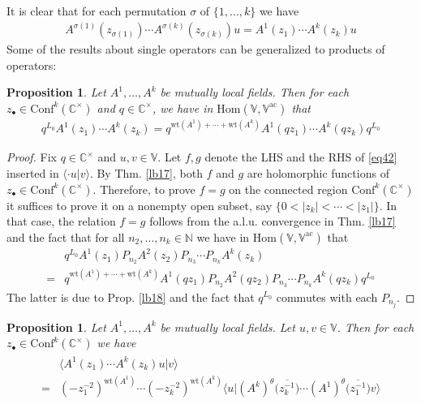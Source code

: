 \documentclass[12pt,b5paper,notitlepage]{article}
\theoremstyle{definition}
\theoremstyle{plain}
\newtheorem{pp}[df]{Proposition}
\newcommand{\ovl}{\overline}
\newcommand{\Hom}{\mathrm{Hom}}
\newcommand{\Conf}{\mathrm{Conf}}
\newcommand{\bk}[1]{\langle {#1}\rangle}
\newcommand{\bigbk}[1]{\big\langle {#1}\big\rangle}
\newcommand{\blt}{\bullet}
\newcommand{\Vbb}{\mathbb V}
\newcommand{\Cbb}{\mathbb C}
\newcommand{\Nbb}{\mathbb N}
\newcommand{\wt}{\mathrm{wt}}
\newcommand{\ac}{\mathrm{ac}}
\numberwithin{equation}{section}
\begin{document}
It is clear that for each permutation $\sigma$ of $\{1,\dots,k\}$ we have
\begin{align}\label{eq77}
A^{\sigma(1)}(z_{\sigma(1)})\cdots A^{\sigma(k)}(z_{\sigma(k)})u=A^1(z_1)\cdots A^k(z_k)u
\end{align}
Some of the results about single operators can be generalized to products of operators:

\begin{pp}\label{lb19}
Let $A^1,\dots,A^k$ be mutually local fields. Then for each $z_\blt\in\Conf^k(\Cbb^\times)$ and $q\in\Cbb^\times$, we have in $\Hom(\Vbb,\Vbb^\ac)$ that
\begin{align}\label{eq42}
q^{L_0}A^1(z_1)\cdots A^k(z_k)=q^{\wt(A^1)+\cdots+\wt(A^k)}A^1(qz_1)\cdots A^k(qz_k)q^{L_0}
\end{align}
\end{pp}

\begin{proof}
Fix $q\in\Cbb^{\times}$ and $u,v\in\Vbb$. Let $f,g$ denote the LHS and the RHS of \eqref{eq42} inserted in $\bk{\cdot u|v}$. By Thm. \ref{lb17}, both $f$ and $g$ are holomorphic functions of $z_\blt\in\Conf^k(\Cbb^\times)$. Therefore, to prove $f=g$ on the connected region $\Conf^k(\Cbb^\times)$ it suffices to prove it on a nonempty open subset, say $\{0<|z_k|<\cdots<|z_1|\}$. In that case, the relation $f=g$ follows from the a.l.u. convergence in Thm. \ref{lb17} and the fact that for all $n_2,\dots,n_k\in\Nbb$ we have in $\Hom(\Vbb,\Vbb^\ac)$ that
\begin{align*}
&q^{L_0}A^1(z_1)P_{n_2}A^2(z_2)P_{n_3}\cdots P_{n_k}A^k(z_k)\\
=&q^{\wt(A^1)+\cdots+\wt(A^k)}A^1(qz_1)P_{n_2}A^2(qz_2)P_{n_3}\cdots P_{n_k}A^k(qz_k)q^{L_0}
\end{align*}
The latter is due to Prop. \ref{lb18} and the fact that $q^{L_0}$ commutes with each $P_{n_j}$.
\end{proof}


\begin{pp}\label{lb21}
Let $A^1,\dots,A^k$ be mutually local fields. Let $u,v\in\Vbb$. Then for each $z_\blt\in\Conf^k(\Cbb^\times)$ we have
\begin{align}\label{eq43}
\begin{aligned}
&\bk{A^1(z_1)\cdots A^k(z_k)u|v}\\
=&(-z_1^{-2})^{\wt(A^1)}\cdots (-z_k^{-2})^{\wt(A^k)}\bigbk{u\big|(A^k)^\theta\big(\ovl{z_k^{-1}}\big)\cdots(A^1)^\theta\big(\ovl{z_1^{-1}} \big)v}
\end{aligned}
\end{align}
\end{pp}
\end{document}
